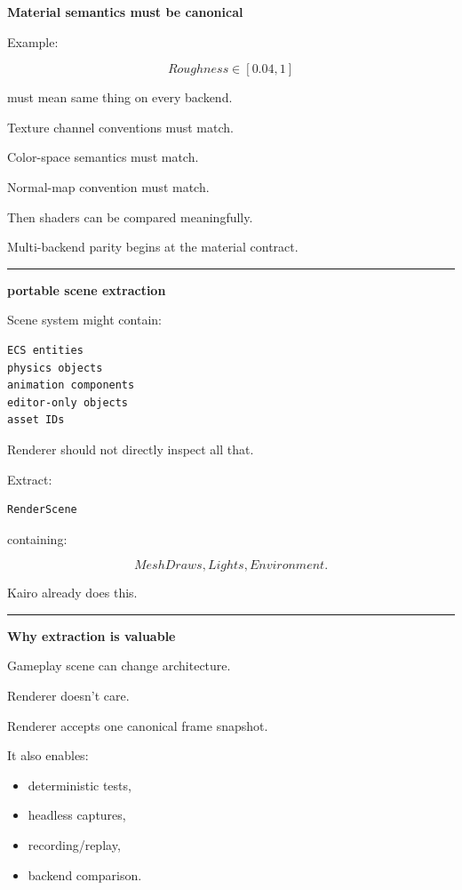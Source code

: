 \textbf{Material semantics must be canonical}

Example:

\[
Roughness\in[0.04,1]
\]

must mean same thing on every backend.

Texture channel conventions must match.

Color-space semantics must match.

Normal-map convention must match.

Then shaders can be compared meaningfully.

Multi-backend parity begins at the material contract.

\begin{center}\rule{0.5\linewidth}{0.5pt}\end{center}

\textbf{portable scene extraction}

Scene system might contain:

\begin{verbatim}
ECS entities
physics objects
animation components
editor-only objects
asset IDs
\end{verbatim}

Renderer should not directly inspect all that.

Extract:

\begin{verbatim}
RenderScene
\end{verbatim}

containing:

\[
MeshDraws,
Lights,
Environment.
\]

Kairo already does this.

\begin{center}\rule{0.5\linewidth}{0.5pt}\end{center}

\textbf{Why extraction is valuable}

Gameplay scene can change architecture.

Renderer doesn't care.

Renderer accepts one canonical frame snapshot.

It also enables:

\begin{itemize}
\tightlist
\item
  deterministic tests,
\item
  headless captures,
\item
  recording/replay,
\item
  backend comparison.
\end{itemize}

